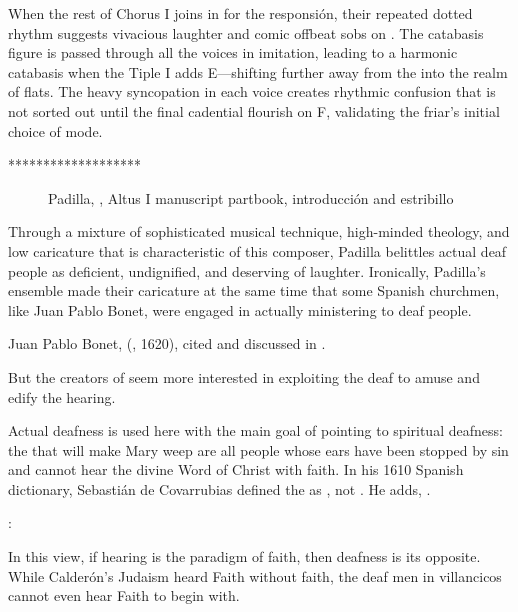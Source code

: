 When the rest of Chorus I joins in for the responsión, their repeated dotted rhythm suggests vivacious laughter and comic offbeat sobs on .
The catabasis figure is passed through all the voices in imitation, leading to a harmonic catabasis when the Tiple I adds E\fl{}---shifting further away from the  into the  realm of flats.%
\citXXX[chafe?]
The heavy syncopation in each voice creates rhythmic confusion that is not sorted out until the final cadential flourish on F, validating the friar's initial choice of mode.

 *******************
\begin{figure}
  \caption{Padilla, , Altus I manuscript partbook, introducción and estribillo}
  \label{figure:Padilla-Sordo-MS-estribillo}
\end{figure}

Through a mixture of sophisticated musical technique, high-minded theology, and low caricature that is characteristic of this composer, Padilla belittles actual deaf people as deficient, undignified, and deserving of laughter.
Ironically, Padilla's ensemble made their caricature at the same time that some Spanish churchmen, like Juan Pablo Bonet, were engaged in actually ministering to deaf people.%
\begin{Footnote}
  Juan Pablo Bonet,  (\XXX, 1620), cited and discussed in \autocite{Plann:DeafEducationSpain}.
\end{Footnote}
But the creators of  seem more interested in exploiting the deaf to amuse and edify the hearing.

Actual deafness is used here with the main goal of pointing to spiritual deafness: the  that will make Mary weep are all people whose ears have been stopped by sin and cannot hear the divine Word of Christ with faith.
In his 1610 Spanish dictionary, Sebastián de Covarrubias defined the  as , not .
He adds, .%
\begin{Footnote}
  \autocite[]{Covarrubias:Tesoro}:
\end{Footnote}
In this view, if hearing is the paradigm of faith, then deafness is its opposite.
While Calderón's Judaism heard Faith without faith, the deaf men in villancicos cannot even hear Faith to begin with.

